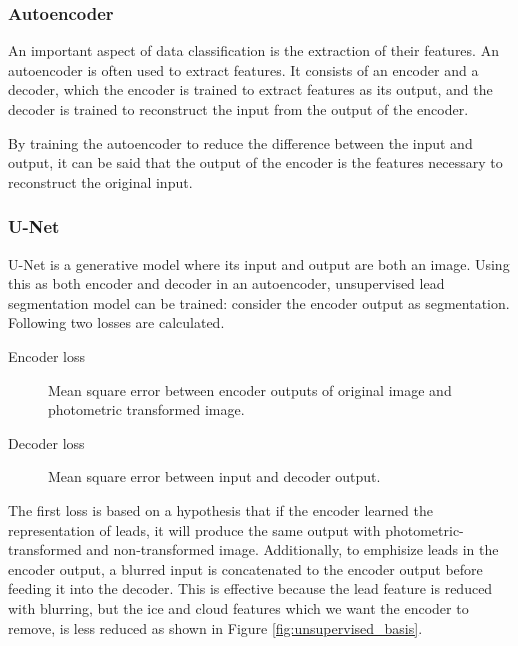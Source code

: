 \documentclass{article}
\begin{document}
        \subsubsection{Autoencoder}
            An important aspect of data classification is
            the extraction of their features.
            An autoencoder \cite{autoencoder} is often used to extract features.
            It consists of an encoder and a decoder,
            which the encoder is trained to extract features as its output,
            and the decoder is trained to reconstruct the input from the output of the encoder.

            By training the autoencoder to reduce the difference between the input and output,
            it can be said that the output of the encoder is the features necessary to reconstruct the original input.

        \subsubsection{U-Net} \label{sec:unsupervised}
            U-Net \cite{unet} is a generative model where its input and output are both an image.
            Using this as both encoder and decoder in an autoencoder,
            unsupervised lead segmentation model can be trained:
            consider the encoder output as segmentation.
            Following two losses are calculated.
            \begin{description}
                \item[Encoder loss]{
                    Mean square error between encoder outputs of original image
                    and photometric transformed image.
                }
                \item[Decoder loss]{
                    Mean square error between input and decoder output.
                }
            \end{description}

            The first loss is based on a hypothesis that
            if the encoder learned the representation of leads,
            it will produce the same output with photometric-transformed and non-transformed image.
            Additionally, to emphisize leads in the encoder output,
            a blurred input is concatenated to the encoder output before feeding it into the decoder.
            This is effective because the lead feature is reduced
            with blurring, but the ice and cloud features which we want the encoder to remove,
            is less reduced as shown in Figure \ref{fig:unsupervised_basis}.
\end{document}
